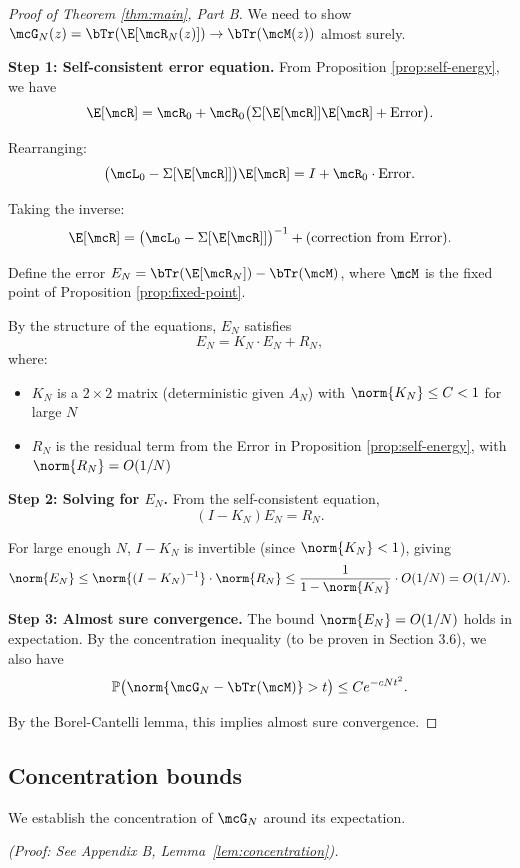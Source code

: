 \begin{proof}[Proof of Theorem \ref{thm:main}, Part B]
We need to show $\mcG_N(z) = \bTr(\E[\mcR_N(z)]) \to \bTr(\mcM(z))$ almost surely.

\textbf{Step 1: Self-consistent error equation.} From Proposition \ref{prop:self-energy}, we have
\[
\E[\mcR] = \mcR_0 + \mcR_0 \bigl(\Sigma[\E[\mcR]] \E[\mcR] + \text{Error}\bigr).
\]

Rearranging:
\[
\bigl(\mcL_0 - \Sigma[\E[\mcR]]\bigr) \E[\mcR] = I + \mcR_0 \cdot \text{Error}.
\]

Taking the inverse:
\[
\E[\mcR] = \bigl(\mcL_0 - \Sigma[\E[\mcR]]\bigr)^{-1} + (\text{correction from Error}).
\]

Define the error $E_N = \bTr(\E[\mcR_N]) - \bTr(\mcM)$, where $\mcM$ is the fixed point of Proposition \ref{prop:fixed-point}.

By the structure of the equations, $E_N$ satisfies
\[
E_N = K_N \cdot E_N + R_N,
\]
where:
\begin{itemize}
\item $K_N$ is a $2 \times 2$ matrix (deterministic given $A_N$) with $\norm{K_N} \leq C < 1$ for large $N$
\item $R_N$ is the residual term from the Error in Proposition \ref{prop:self-energy}, with $\norm{R_N} = O(1/N)$
\end{itemize}

\textbf{Step 2: Solving for $E_N$.} From the self-consistent equation,
\[
(I - K_N) E_N = R_N.
\]

For large enough $N$, $I - K_N$ is invertible (since $\norm{K_N} < 1$), giving
\[
\norm{E_N} \leq \norm{(I - K_N)^{-1}} \cdot \norm{R_N} \leq \frac{1}{1 - \norm{K_N}} \cdot O(1/N) = O(1/N).
\]

\textbf{Step 3: Almost sure convergence.} The bound $\norm{E_N} = O(1/N)$ holds in expectation. By the concentration inequality (to be proven in Section 3.6), we also have
\[
\mathbb{P}\bigl(\norm{\mcG_N - \bTr(\mcM)} > t\bigr) \leq Ce^{-cNt^2}.
\]

By the Borel-Cantelli lemma, this implies almost sure convergence.
\end{proof}

\subsection{Concentration bounds}

We establish the concentration of $\mcG_N$ around its expectation.


\emph{(Proof: See Appendix B, Lemma~\ref{lem:concentration}).}

